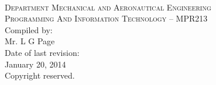 \begin{titlepage}
    \thispagestyle{empty}
    \begin{center}
        \ \\
        \vspace{2cm}
        {\Large \textsc{Department Mechanical and Aeronautical
                        Engineering}} \\
        \vspace{1.5cm}
        {\huge \textsc{Programming And Information Technology -- MPR213}} \\
        \vspace{3cm}
        {\large Compiled by:} \\
        \vspace{0.2cm}
        {\large Mr. L G Page} \\
        \vspace{1cm}
        {\large Date of last revision:} \\
        \vspace{0.2cm}
        {\large January 20, 2014} \\
        \vspace{1cm}
        {\large Copyright reserved.} \\
    \end{center}
\end{titlepage}
